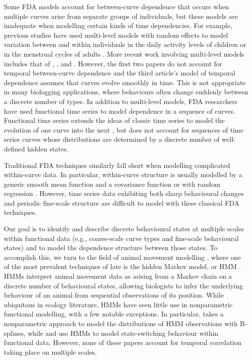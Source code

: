 Some FDA models account for between-curve dependence that occurs when multiple curves arise from separate groups of individuals, but these models are inadequate when modelling certain kinds of time dependencies. For example, previous studies have used multi-level models with random effects to model variation between and within individuals in the daily activity levels of children \citep{Morris:2007} or in the menstrual cycles of adults \citep{Bromback:1998}. More recent work involving multi-level models includes that of \citet{Crainiceanu:2009}, \citet{Di:2009}, and \citet{Chen:2012}. 
However, the first two papers do not account for temporal between-curve dependence and the third article's model of temporal dependence assumes that curves evolve smoothly in time. This is not appropriate in many biologging applications, where behaviours often change suddenly between a discrete number of types.
In addition to multi-level models, FDA researchers have used functional time series to model dependence in a sequence of curves. Functional time series extends the ideas of classic time series to model the evolution of one curve into the next \citep{Kokoszka:2018}, but does not account for sequences of time series curves whose distributions are determined by a discrete number of well-defined hidden states.

Traditional FDA techniques similarly fall short when modelling complicated within-curve data. In particular, within-curve structure is usually modelled by a generic smooth mean function and a covariance function \citep{Yao:2005} or with random regression \citep{Rice:2001}. However, time series data exhibiting both sharp behavioural changes and periodic fine-scale structure are difficult to model with these classical FDA techniques.

Our goal is to identify and describe discrete behavioural states at multiple scales within functional data (e.g., coarse-scale curve types and fine-scale behavioural states) and to model the dependence structure between those states. To accomplish this, we turn to the field of animal movement modelling \citep{Hooten:2017}, where one of the most prevalent techniques of late is the hidden Markov model, or HMM \citep{Patterson:2017,McClintock:2020}. HMMs interpret animal movement data as arising from a Markov chain on a discrete number of behavioural states, allowing biologists to infer the underlying behaviour of an animal from sequential observations of its position. While ubiquitous in ecology literature, HMMs have seen little use in nonparametric functional modelling, with a few notable exceptions. In particular, \citet{Langrock:2018} takes a nonparametric approach to model the distributions of HMM observations with B-splines, while \citet{DeSouza:2014} and \citet{DeSouza:2017} use HMMs to model state-switching behaviour within functional data. However, none of these papers account for temporal correlation taking place on multiple scales. 


